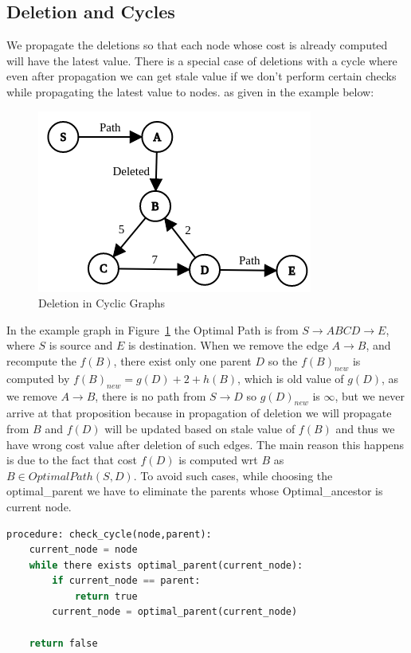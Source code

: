 \documentclass[a4paper]{article}
\begin{document}
\subsection{Deletion and Cycles}\label{subsec:del_cycle}
We propagate the deletions so that each node whose cost is already computed will have the latest value. There is a special case of deletions with a cycle where even after propagation we can get stale value if we don't perform certain checks while propagating the latest value to nodes. as given in the example below:
\begin{figure}[H]
    \centering
    \includegraphics[scale=0.45]{img/cycle.png}
    \caption{Deletion in Cyclic Graphs }
    \label{fig:delete_cycle}
\end{figure}
In the example graph in Figure~\ref{fig:delete_cycle} the Optimal Path is from $S \rightarrow ABCD \rightarrow E$, where $S$ is source and $E$ is destination. When we remove the edge $A \rightarrow B$, and recompute the $f(B)$, there exist only one parent $D$ so the $f(B)_{new}$ is computed by $f(B)_{new} = g(D) + 2 + h(B)$, which is old value of $g(D)$, as we remove $A \rightarrow B$, there is no path from $S \rightarrow D$ so $g(D)_{new}$ is $\infty$, but we never arrive at that proposition because in propagation of deletion we will propagate from $B$  and $f(D)$ will be updated based on stale value of $f(B)$ and thus we have wrong cost value after deletion of such edges. The main reason this happens is due to the fact that cost $f(D)$ is computed wrt $B$ as $B \in OptimalPath(S,D)$. To avoid such cases, while choosing the optimal\_parent we have to eliminate the parents whose Optimal\_ancestor is current node.\\
\begin{lstlisting}[language=python, caption=Check Cycles]
procedure: check_cycle(node,parent):
    current_node = node
    while there exists optimal_parent(current_node):
        if current_node == parent:
            return true
        current_node = optimal_parent(current_node)
    
    return false
\end{lstlisting}
\end{document}
